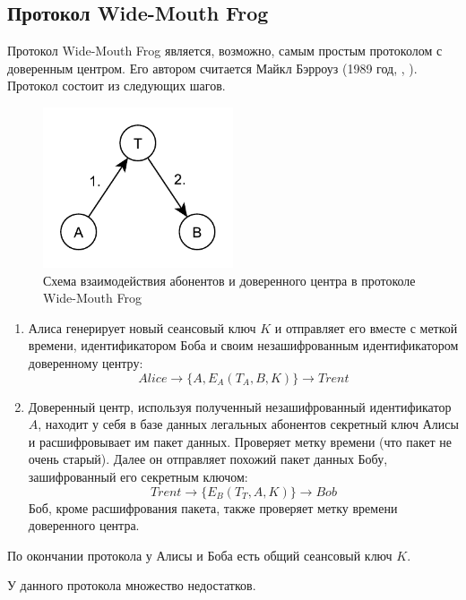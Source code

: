 \subsection{Протокол Wide-Mouth Frog}
Протокол Wide-Mouth Frog является, возможно, самым простым протоколом с доверенным центром. Его автором считается Майкл Бэрроуз (1989 год, ,  \cite{Burrows:Abadi:Needham:1990}). Протокол состоит из следующих шагов.

\begin{figure}[!htb]
    \centering
    \includegraphics[width=0.5\textwidth]{pic/key_distribution-wide-mouth_frog}
    \caption{Схема взаимодействия абонентов и доверенного центра в протоколе Wide-Mouth Frog\label{fig:key_distribution-wide-mouth_frog}}
\end{figure}

\begin{enumerate}
	\item Алиса генерирует новый сеансовый ключ $K$ и отправляет его вместе с меткой времени, идентификатором Боба и своим незашифрованным идентификатором доверенному центру:
	\[ Alice \rightarrow \{ A, E_A \left( T_A, B, K \right) \} \rightarrow Trent \]
	\item Доверенный центр, используя полученный незашифрованный идентификатор $A$, находит у себя в базе данных легальных абонентов секретный ключ Алисы и расшифровывает им пакет данных. Проверяет метку времени (что пакет не очень старый). Далее он отправляет похожий пакет данных Бобу, зашифрованный его секретным ключом:
	\[ Trent \rightarrow \{ E_B \left( T_T, A, K \right) \} \rightarrow Bob \]
	Боб, кроме расшифрования пакета, также проверяет метку времени доверенного центра.
\end{enumerate}

По окончании протокола у Алисы и Боба есть общий сеансовый ключ $K$.

У данного протокола множество недостатков.


